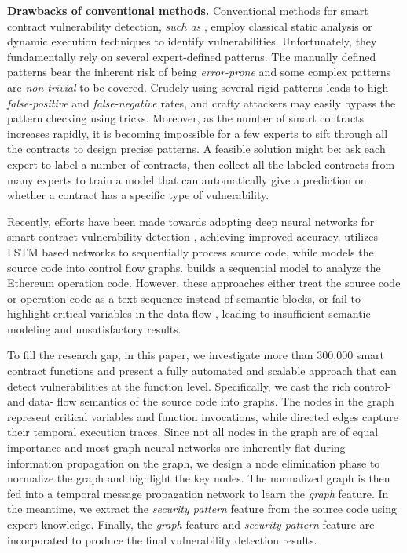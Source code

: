 \textbf{Drawbacks of conventional methods.} Conventional methods for smart contract vulnerability detection, \emph{such as} \cite{oyente,smartcheck,contractfuzzer,securify}, employ classical static analysis or dynamic execution techniques to identify vulnerabilities. Unfortunately, they fundamentally rely on several expert-defined patterns. The manually defined patterns bear the inherent risk of being \emph{error-prone} and some complex patterns are \emph{non-trivial} to be covered. Crudely using several rigid patterns leads to high \emph{false-positive} and \emph{false-negative} rates, and crafty attackers may easily bypass the pattern checking using tricks. Moreover, as the number of smart contracts increases rapidly, it is becoming impossible for a few experts to sift through all the contracts to design precise patterns. A feasible solution might be: ask each expert to label a number of contracts, then collect all the labeled contracts from many experts to train a model that can automatically give a prediction on whether a contract has a specific type of vulnerability. 

Recently, efforts have been made towards adopting deep neural networks for smart contract vulnerability detection \cite{pengqian,ijcai,Wesley}, achieving improved accuracy. \cite{pengqian} utilizes LSTM based networks to sequentially process source code, while \cite{ijcai} models the source code into control flow graphs. \cite{Wesley} builds a sequential model to analyze the Ethereum operation code. However, these approaches either treat the source code or operation code as a text sequence instead of semantic blocks, or fail to highlight critical variables in the data flow \cite{ijcai}, leading to insufficient semantic modeling and unsatisfactory results. 

To fill the research gap, in this paper, we investigate more than 300,000 smart contract functions and present a fully automated and scalable approach that can detect vulnerabilities at the function level. Specifically, we cast the rich control- and data- flow semantics of the source code into graphs. The nodes in the graph represent critical variables and function invocations, while directed edges capture their temporal execution traces. Since not all nodes in the graph are of equal importance and most graph neural networks are inherently flat during information propagation on the graph, we design a node elimination phase to normalize the graph and highlight the key nodes. The normalized graph is then fed into a temporal message propagation network to learn the \emph{graph} feature. In the meantime, we extract the \emph{security pattern} feature from the source code using expert knowledge. Finally, the \emph{graph} feature and \emph{security pattern} feature are incorporated to produce the final vulnerability detection results. 

